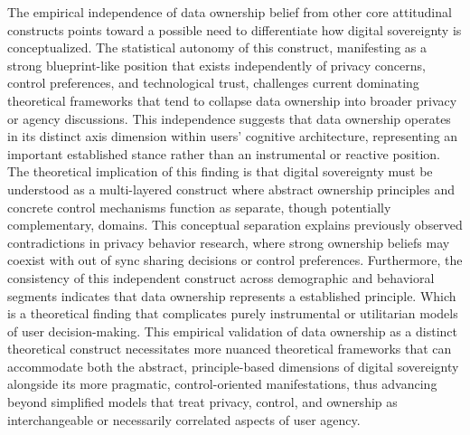 	The empirical independence of data ownership belief from other core attitudinal constructs points toward a possible need to differentiate how digital sovereignty is conceptualized. The statistical autonomy of this construct, manifesting as a strong blueprint-like position that exists independently of privacy concerns, control preferences, and technological trust, challenges current dominating theoretical frameworks that tend to collapse data ownership into broader privacy or agency discussions. This independence suggests that data ownership operates in its distinct axis dimension within users' cognitive architecture, representing an important established stance rather than an instrumental or reactive position. The theoretical implication of this finding is that digital sovereignty must be understood as a multi-layered construct where abstract ownership principles and concrete control mechanisms function as separate, though potentially complementary, domains. This conceptual separation explains previously observed contradictions in privacy behavior research, where strong ownership beliefs may coexist with out of sync sharing decisions or control preferences. Furthermore, the consistency of this independent construct across demographic and behavioral segments indicates that data ownership represents a established principle. Which is a theoretical finding that complicates purely instrumental or utilitarian models of user decision-making. This empirical validation of data ownership as a distinct theoretical construct necessitates more nuanced theoretical frameworks that can accommodate both the abstract, principle-based dimensions of digital sovereignty alongside its more pragmatic, control-oriented manifestations, thus advancing beyond simplified models that treat privacy, control, and ownership as interchangeable or necessarily correlated aspects of user agency.

